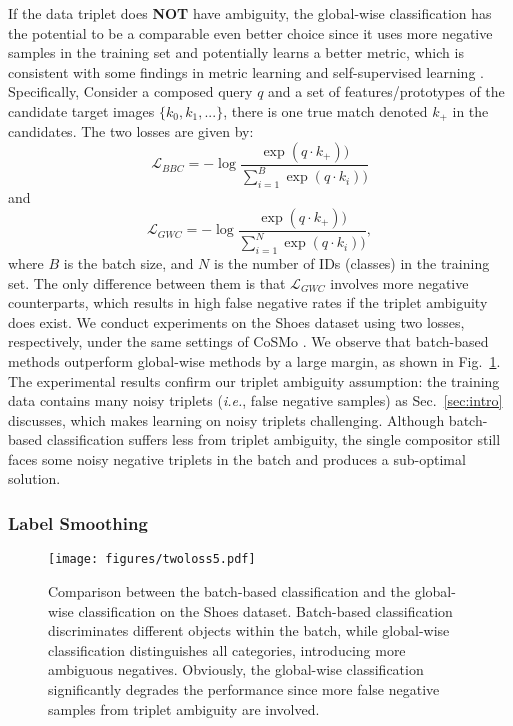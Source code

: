 \documentclass[sigconf]{acmart}
\def\ie{\emph{i.e.}}
\begin{document}
If the data triplet does \textbf{NOT} have ambiguity, the global-wise classification has the potential to be a comparable even better choice since it uses more negative samples in the training set and potentially learns a better metric, which is consistent with some findings in metric learning \cite{hermans2017defense,sheng2020mining,wang2020cross} and self-supervised learning \cite{chen2020simple,he2020momentum}. Specifically, Consider a composed query $q$ and a set of features/prototypes of the candidate target images  $\{k_0, k_1, ...\}$, there is one true match denoted $k_+$ in the candidates. The two losses are given by:
\begin{equation}
    \mathcal{L}_{BBC} = -\log\frac{\exp(q\cdot k_+))}{\sum_{i=1}^{B}\exp(q\cdot k_i))}
\end{equation}
and
\begin{equation}
    \mathcal{L}_{GWC} =  -\log\frac{\exp(q\cdot k_+))}{\sum_{i=1}^{N}\exp(q\cdot k_i))},
\end{equation}
where $B$ is the batch size, and $N$ is the number of IDs (classes) in the training set. The only difference between them is that $\mathcal{L}_{GWC}$ involves more negative counterparts, which results in high false negative rates if the triplet ambiguity does exist. We conduct experiments on the Shoes dataset \cite{berg2010automatic} using two losses, respectively, under the same settings of CoSMo \cite{lee2021cosmo}. We observe that batch-based methods outperform global-wise methods by a large margin, as shown in Fig.~\ref{fig:twolosses}. The experimental results confirm our triplet ambiguity assumption: the training data contains many noisy triplets (\ie, false negative samples) as Sec.~\ref{sec:intro} discusses, which makes learning on noisy triplets challenging. Although batch-based classification suffers less from triplet ambiguity, the single compositor still faces some noisy negative triplets in the batch and produces a sub-optimal solution.

\subsubsection{Label Smoothing}
\label{subsubsec:smoothing}
\begin{figure}[t!]
    \centering
    \texttt{[image: figures/twoloss5.pdf]}
    \caption{Comparison between the batch-based classification and the global-wise classification on the Shoes dataset. Batch-based classification discriminates different objects within the batch, while global-wise classification distinguishes all categories, introducing more ambiguous negatives. Obviously, the global-wise classification significantly degrades the performance since more false negative samples from triplet ambiguity are involved.}
    \label{fig:twolosses}
\end{figure}
\end{document}
